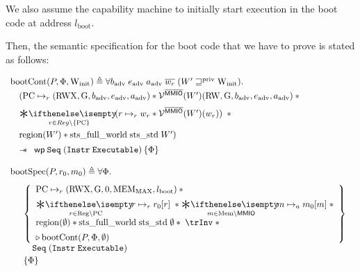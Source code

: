 \documentclass{article}
\newcommand{\X}[1]{\ensuremath{\mathrm{#1}}}
\newcommand{\I}[1]{\ensuremath{\mathtt{#1}}}
\newcommand{\Sf}[1]{\ensuremath{\mathsf{#1}}}
\newcommand{\MMIO}{\Sf{MMIO}\xspace}
\newcommand{\bigast}[2]{\underset{#1}\Sep{\!\!\! #2}\;}
\begin{document}
We also assume the capability machine to initially start execution in the boot code  at address $l_{\X{boot}}$.

%
Then, the semantic specification for the boot code that we have to prove is
stated as follows:

\[
  \begin{array}{l}

 \X{bootCont}(P,\Phi,\Winit) \eqdef \forall b_{\X{adv}}\; e_{\X{adv}}\; a_{\X{adv}}\;\overline{w_r}\; (W' \Wpriv \Winit) \ldotp\;  \\[0.2em]
    \begin{array}{l}
      \begin{array}{l}
        (\X{PC} \mapsto_{r} (\X{RWX}, \X{G}, b_{\X{adv}}, e_{\X{adv}}, a_{\X{adv}})
        \ast \VR^{\notMMIO} (W')(\X{RW}, \X{G}, b_{\X{adv}}, e_{\X{adv}}, a_{\X{adv}}) \ast {} \\[.6em]
        \bigast{r \in Reg\setminus \{\X{PC}\}}{(r \mapsto_{r} w_r \ast
        \VR^{\notMMIO} (W')(w_r))} \ast {} \\[1.2em]
        \X{region}(W') \ast  \X{sts\_full\_world}\; \X{sts\_std} \;
        W')\\[0.5em]       \end{array}
    \end{array} \\[2em]
    \quad\wand
    \begin{array}{l}
     \wpre{\I{Seq}\; (\I{Instr}\; \I{Executable})}{\Phi}
    \end{array}\\[1.2em]

  \X{bootSpec}(P,r_0,m_0) \eqdef \forall \Phi \ldotp \\[0.8em]
    \quad
  \begin{array}{l}
    \left\{
    \begin{array}{l}
      \X{PC} \mapsto_{r} (\X{RWX}, \X{G}, 0, \X{MEM_{MAX}}, l_{\X{boot}}) \ast {} \\[0.5em]
      \bigast{r \in \X{Reg} \setminus \X{PC}}{r \mapsto_{r} r_{0}[r]}
      \ast \bigast{m \in \X{Mem} \setminus \MMIO}{m \mapsto_{a} m_{0}[m]} \ast\\[.5em]
      \X{region}(\emptyset) \ast  \X{sts\_full\_world}\; \X{sts\_std} \; \emptyset\ast \; \trInv \; \ast \\[.5em]
      \later \X{bootCont}(P,\Phi,\emptyset)
    \end{array}
    \right\}
    \\[2.5em]
    \quad \I{Seq}\; (\I{Instr}\; \I{Executable})
    \\[0.2em]
    \left\{ \Phi \right\}
  \end{array}\\[4em]

  \end{array}
\]
\end{document}
